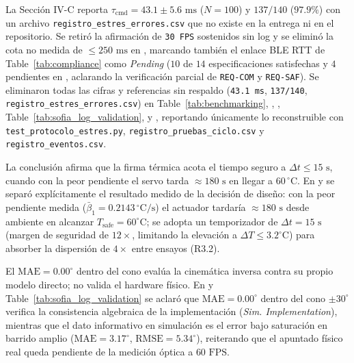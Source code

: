 \documentclass{LabDSTresponse}
\begin{document}
{La Sección IV-C reporta $\tau_{\text{cmd}} = 43.1 \pm 5.6\text{ ms}$ ($N=100$) y $137/140$ ($97.9\%$) con un archivo \texttt{registro\_estres\_errores.csv} que no existe en la entrega ni en el repositorio.}
{Se retiró la afirmación de \texttt{30~FPS} sostenidos sin log y se eliminó la cota no medida de $\le 250\text{ ms}$ en , marcando también el enlace BLE RTT de Table~\ref{tab:compliance} como \textit{Pending} ($10$ de $14$ especificaciones satisfechas y $4$ pendientes en , aclarando la verificación parcial de \texttt{REQ-COM} y \texttt{REQ-SAF}). Se eliminaron todas las cifras y referencias sin respaldo (\texttt{43.1 ms}, \texttt{137/140}, \texttt{registro\_estres\_errores.csv}) en Table~\ref{tab:benchmarking}, , , Table~\ref{tab:sofia_log_validation},  y , reportando únicamente lo reconstruible con \texttt{test\_protocolo\_estres.py}, \texttt{registro\_pruebas\_ciclo.csv} y \texttt{registro\_eventos.csv}.}

{La conclusión afirma que la firma térmica acota el tiempo seguro a $\Delta t \le 15\text{ s}$, cuando con la peor pendiente el servo tarda $\approx 180\text{ s}$ en llegar a $60\,^\circ\text{C}$.}
{En  y  se separó explícitamente el resultado medido de la decisión de diseño: con la peor pendiente medida ($\bar{\beta}_1 = 0.2143\,^\circ\text{C/s}$) el actuador tardaría $\approx 180\text{ s}$ desde ambiente en alcanzar $T_{\text{safe}} = 60^\circ\text{C}$; se adopta un temporizador de $\Delta t = 15\text{ s}$ (margen de seguridad de $12\times$, limitando la elevación a $\Delta T \le 3.2^\circ\text{C}$) para absorber la dispersión de $4\times$ entre ensayos (R3.2).}

{El $\text{MAE} = 0.00^\circ$ dentro del cono evalúa la cinemática inversa contra su propio modelo directo; no valida el hardware físico.}
{En  y Table~\ref{tab:sofia_log_validation} se aclaró que $\text{MAE} = 0.00^\circ$ dentro del cono $\pm 30^\circ$ verifica la consistencia algebraica de la implementación (\textit{Sim. Implementation}), mientras que el dato informativo en simulación es el error bajo saturación en barrido amplio ($\text{MAE} = 3.17^\circ$, $\text{RMSE} = 5.34^\circ$), reiterando que el apuntado físico real queda pendiente de la medición óptica a $60\text{ FPS}$.}
\end{document}
